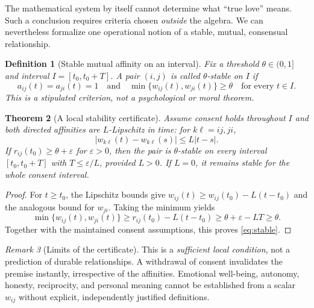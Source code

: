 \documentclass[11pt,a4paper]{article}
\numberwithin{equation}{section}
\newtheorem{definition}{Definition}[section]
\newtheorem{theorem}[definition]{Theorem}
\theoremstyle{remark}
\newtheorem{remark}[definition]{Remark}
\newcommand{\1}{\mathbf{1}}
\begin{document}
The mathematical system by itself cannot determine what ``true love''
means.  Such a conclusion requires criteria chosen \emph{outside} the
algebra.  We can nevertheless formalize one operational notion of a
stable, mutual, consensual relationship.

\begin{definition}[Stable mutual affinity on an interval]
Fix a threshold $\theta\in(0,1]$ and interval
$I=[t_0,t_0+T]$.  A pair $(i,j)$ is called
$\theta$-stable on $I$ if
\begin{equation}\label{eq:stable}
a_{ij}(t)=a_{ji}(t)=1
\quad\text{and}\quad
\min\{w_{ij}(t),w_{ji}(t)\}\ge\theta
\quad\text{for every }t\in I.
\end{equation}
This is a stipulated criterion, not a psychological or moral theorem.
\end{definition}

\begin{theorem}[A local stability certificate]\label{thm:stability}
Assume consent holds throughout $I$ and both directed affinities are
$L$-Lipschitz in time: for $k\ell=ij,ji$,
\begin{equation}
|w_{k\ell}(t)-w_{k\ell}(s)|\le L|t-s|.
\end{equation}
If $r_{ij}(t_0)\ge\theta+\varepsilon$ for $\varepsilon>0$, then the
pair is $\theta$-stable on every interval
$[t_0,t_0+T]$ with $T\le\varepsilon/L$, provided $L>0$.
If $L=0$, it remains stable for the whole consent interval.
\end{theorem}
\begin{proof}
For $t\ge t_0$, the Lipschitz bounds give
$w_{ij}(t)\ge w_{ij}(t_0)-L(t-t_0)$ and the analogous bound
for $w_{ji}$.  Taking the minimum yields
\begin{equation}
\min\{w_{ij}(t),w_{ji}(t)\}
\ge r_{ij}(t_0)-L(t-t_0)
\ge\theta+\varepsilon-LT\ge\theta.
\end{equation}
Together with the maintained consent assumptions, this proves
\eqref{eq:stable}.
\end{proof}

\begin{remark}[Limits of the certificate]
This is a \emph{sufficient local condition}, not a prediction of
durable relationships.  A withdrawal of consent invalidates the
premise instantly, irrespective of the affinities.  Emotional
well-being, autonomy, honesty, reciprocity, and personal meaning
cannot be established from a scalar $w_{ij}$ without explicit,
independently justified definitions.
\end{remark}
\end{document}
